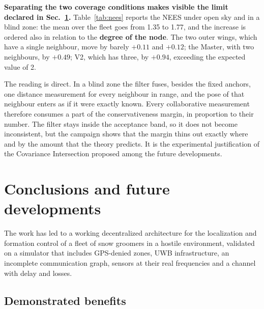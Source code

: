 \documentclass[conference,9pt]{IEEEtran}
\begin{document}
\textbf{Separating the two coverage conditions makes visible the limit declared
in Sec.~\ref{sec:conclusioni}.} Table~\ref{tab:nees} reports the NEES under open
sky and in a blind zone: the mean over the fleet goes from 1.35 to 1.77, and
the increase is ordered also in relation to the \textbf{degree of the node}. The two
outer wings, which have a single neighbour, move by barely $+0.11$ and $+0.12$;
the Master, with two neighbours, by $+0.49$; V2, which has three, by $+0.94$,
exceeding the expected value of 2.

The reading is direct. In a blind zone the filter fuses, besides the fixed
anchors, one distance measurement for every neighbour in range, and the pose of
that neighbour enters as if it were exactly known. Every collaborative
measurement therefore consumes a part of the conservativeness margin, in
proportion to their number. The filter stays inside the acceptance band, so it
does not become inconsistent, but the campaign shows that the margin thins out
exactly where and by the amount that the theory predicts. It is the
experimental justification of the Covariance Intersection proposed among the
future developments.

\section{Conclusions and future developments}
\label{sec:conclusioni}

The work has led to a working decentralized architecture for the localization
and formation control of a fleet of snow groomers in a hostile environment,
validated on a simulator that includes GPS-denied zones, UWB infrastructure, an
incomplete communication graph, sensors at their real frequencies and a channel
with delay and losses.

\subsection{Demonstrated benefits}
\end{document}
